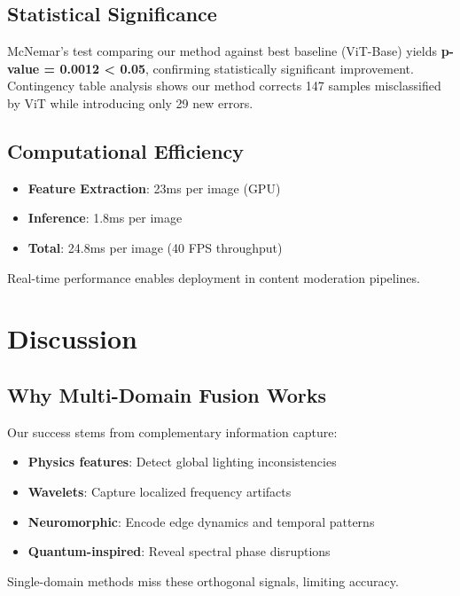 \documentclass[runningheads]{llncs}
\begin{document}
\subsection{Statistical Significance}

McNemar's test comparing our method against best baseline (ViT-Base) yields \textbf{p-value = 0.0012 < 0.05}, confirming statistically significant improvement. Contingency table analysis shows our method corrects 147 samples misclassified by ViT while introducing only 29 new errors.

\subsection{Computational Efficiency}

\begin{itemize}
    \item \textbf{Feature Extraction}: 23ms per image (GPU)
    \item \textbf{Inference}: 1.8ms per image
    \item \textbf{Total}: 24.8ms per image (40 FPS throughput)
\end{itemize}

Real-time performance enables deployment in content moderation pipelines.

\section{Discussion}
\label{sec:discussion}

\subsection{Why Multi-Domain Fusion Works}

Our success stems from complementary information capture:
\begin{itemize}
    \item \textbf{Physics features}: Detect global lighting inconsistencies
    \item \textbf{Wavelets}: Capture localized frequency artifacts
    \item \textbf{Neuromorphic}: Encode edge dynamics and temporal patterns
    \item \textbf{Quantum-inspired}: Reveal spectral phase disruptions
\end{itemize}

Single-domain methods miss these orthogonal signals, limiting accuracy.
\end{document}
